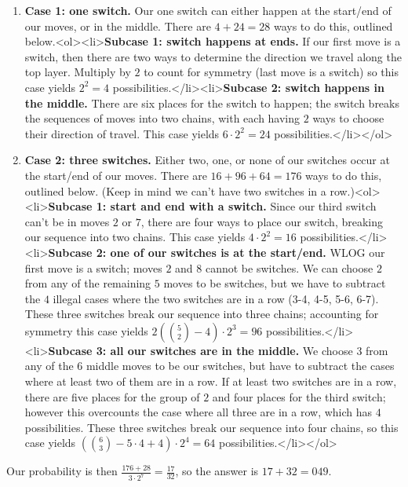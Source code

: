 \begin{enumerate}
 
            \begin{enumerate}
        \item \textbf{Case 1: one switch.} Our one switch can either happen at the start/end of our moves, or in the middle. There are $4 + 24 = 28$ ways to do this, outlined below.<ol><li>\textbf{Subcase 1: switch happens at ends.} If our first move is a switch, then there are two ways to determine the direction we travel along the top layer. Multiply by $2$ to count for symmetry (last move is a switch) so this case yields $2^2 = 4$ possibilities.</li><li>\textbf{Subcase 2: switch happens in the middle.} There are six places for the switch to happen; the switch breaks the sequences of moves into two chains, with each having $2$ ways to choose their direction of travel. This case yields $6 \cdot 2^2 = 24$ possibilities.</li></ol>
        \item \textbf{Case 2: three switches.} Either two, one, or none of our switches occur at the start/end of our moves. There are $16 + 96 + 64 = 176$ ways to do this, outlined below. (Keep in mind we can't have two switches in a row.)<ol><li>\textbf{Subcase 1: start and end with a switch.} Since our third switch can't be in moves $2$ or $7$, there are four ways to place our switch, breaking our sequence into two chains. This case yields $4 \cdot 2^2 = 16$ possibilities.</li><li>\textbf{Subcase 2: one of our switches is at the start/end.} WLOG our first move is a switch; moves $2$ and $8$ cannot be switches. We can choose $2$ from any of the remaining $5$ moves to be switches, but we have to subtract the $4$ illegal cases where the two switches are in a row (3-4, 4-5, 5-6, 6-7). These three switches break our sequence into three chains; accounting for symmetry this case yields $2\left(\binom{5}{2} - 4\right) \cdot 2^3 = 96$ possibilities.</li><li>\textbf{Subcase 3: all our switches are in the middle.} We choose $3$ from any of the $6$ middle moves to be our switches, but have to subtract the cases where at least two of them are in a row. If at least two switches are in a row, there are five places for the group of $2$ and four places for the third switch; however this overcounts the case where all three are in a row, which has $4$ possibilities. These three switches break our sequence into four chains, so this case yields $\left(\binom{6}{3} - 5 \cdot 4 + 4\right) \cdot 2^4 = 64$ possibilities.</li></ol>
            \end{enumerate}
            Our probability is then $\frac{176 + 28}{3 \cdot 2^7} = \frac{17}{32}$, so the answer is $17+32=\boxed{049}$.


\end{enumerate}
